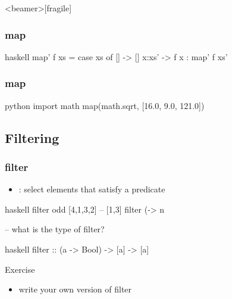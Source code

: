 \documentclass[dvipsnames]{beamer}
\theoremstyle{plain}
\begin{document}
\begin{frame}<beamer>[fragile]
  \frametitle{map}

  \begin{example}[Haskell]
    \begin{pygments}{haskell}
map' f xs =
    case xs of
      [] -> []
      x:xs' -> f x : map' f xs'
    \end{pygments}
  \end{example}
\end{frame}

\begin{frame}[fragile]
  \frametitle{map}

  \begin{example}[Python]
    \begin{pygments}{python}
import math
map(math.sqrt, [16.0, 9.0, 121.0])
    \end{pygments}
  \end{example}
\end{frame}

\subsection{Filtering}

\begin{frame}[fragile]
  \frametitle{filter}

  \begin{itemize}
    \item {}: select elements that satisfy a predicate
  \end{itemize}

  \pause
  \begin{example}[Haskell]
    \begin{pygments}{haskell}
filter odd [4,1,3,2]                    -- [1,3]
filter (\n -> n %

-- what is the type of filter?
    \end{pygments}

    \pause
    \begin{pygments}{haskell}
filter :: (a -> Bool) -> [a] -> [a]
    \end{pygments}
  \end{example}

  \pause
  \begin{block}{Exercise}
    \begin{itemize}
      \item write your own version of filter
    \end{itemize}
  \end{block}
\end{frame}
\end{document}
